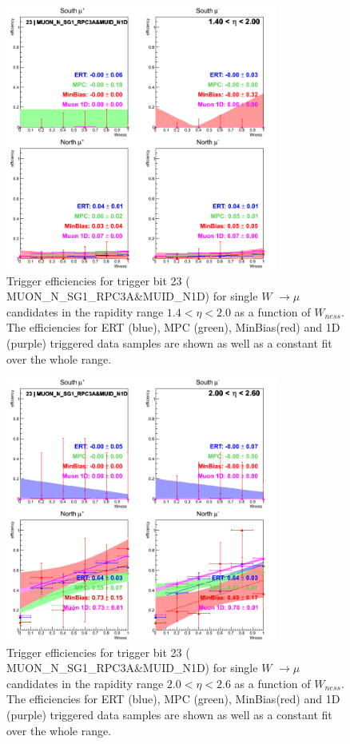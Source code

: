 \begin{figure}[ht]
\begin{center}
\includegraphics[width=0.8\textwidth]{./figures/run13_trigeffisn_eta1_trig23_lin.png}
\caption{\label{fig:run13_trigeffisn_eta1_nper0_trig23_lin} Trigger efficiencies for trigger bit 23 ( MUON\_N\_SG1\_RPC3A\&MUID\_N1D) for single $W$ $\rightarrow \mu$ candidates in the rapidity range $ 1.4 < \eta < 2.0$ as a function of $W_{ness}$. The efficiencies for ERT (blue), MPC (green), MinBias(red) and 1D (purple) triggered data samples are shown as well as a constant fit over the whole range.}
\end{center}
\end{figure}
\begin{figure}[ht]
\begin{center}
\includegraphics[width=0.8\textwidth]{./figures/run13_trigeffisn_eta2_trig23_lin.png}
\caption{\label{fig:run13_trigeffisn_eta2_nper0_trig23_lin} Trigger efficiencies for trigger bit 23 ( MUON\_N\_SG1\_RPC3A\&MUID\_N1D) for single $W$ $\rightarrow \mu$ candidates in the rapidity range $ 2.0 < \eta < 2.6$ as a function of $W_{ness}$. The efficiencies for ERT (blue), MPC (green), MinBias(red) and 1D (purple) triggered data samples are shown as well as a constant fit over the whole range.}
\end{center}
\end{figure}
